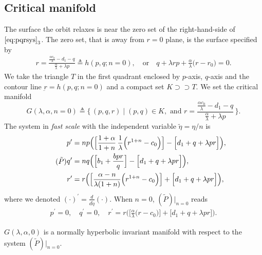 \documentclass[graybox]{svmult}
\begin{document}
\subsection{Critical manifold}
The surface the orbit relaxes is near the zero set of the right-hand-side of $\eqref{eq:pqrsys}_3$. The zero set,  that is away from $r=0$ plane,  is the surface specified by
\begin{align*}
 r=\frac{ \frac{\alpha c_0}{\lambda} - d_1 -q }{ \frac{\alpha}{\lambda} + \lambda p}\triangleq h(p,q;n=0), \quad \text{or} \quad  q + \lambda {r}p + \frac{\alpha}{\lambda} \Big( r-r_0\Big)=0.
\end{align*}
%
%
We take the triangle $T$ in the first quadrant enclosed by $p$-axis, $q$-axis and the contour line $\underbar{r} =  h(p,q;n=0)$ and a compact set $K\supset\supset T$. We set the critical manifold 
\begin{equation}
 G(\lambda,\alpha,n=0) \triangleq \Big\{\, (p,q,r) \;|\; (p,q) \in K, \text{ and } r=\frac{ \frac{\alpha c_0}{\lambda} - d_1 -q }{ \frac{\alpha}{\lambda} + \lambda p} \,\Big\}.
\end{equation}
%
The system in {\it fast scale} with the independent variable $\tilde{\eta} = \eta/n$ is
\begin{equation}\label{eq:pqr_fast} \tag*{($\tilde{P}$)}
\begin{aligned}
 p^\prime &=np\Big( \Big[\frac{1+\alpha}{1+n}\,\frac{1}{\lambda }\Big(r^{1+n}-c_0\Big)\Big] -\Big[d_1 + q + \lambda pr\Big]\Big), \\
 q^\prime &=nq\Big(\Big[b_1 +\frac{bpr}{q}\Big] -\Big[d_1 + q + \lambda pr\Big]\Big), \\
 r^\prime &=r\Big( \Big[\frac{\alpha-n}{\lambda(1+n)}\Big(r^{1+n}-c_0\Big)\Big]+\Big[d_1 + q + \lambda pr\Big]\Big),
\end{aligned}
\end{equation}
where we denoted $\displaystyle(\cdot)^\prime = \frac{d}{d\tilde{\eta}}(\cdot)$. When $n=0$, $(\tilde{P})|_{n=0}$ reads
\begin{align*}
 p^\prime =0, \quad q^\prime =0, \quad r^\prime=r\Big( \Big[\frac{\alpha}{\lambda}\Big(r-c_0\Big)\Big]+\Big[d_1 + q + \lambda pr\Big]\Big). %
\end{align*}
\begin{lemma} \label{lem:normal_hyper}
 $G(\lambda,\alpha,0)$ is a normally hyperbolic invariant manifold with respect to the system $(\tilde{P})|_{n=0}$.
\end{lemma}
\end{document}
